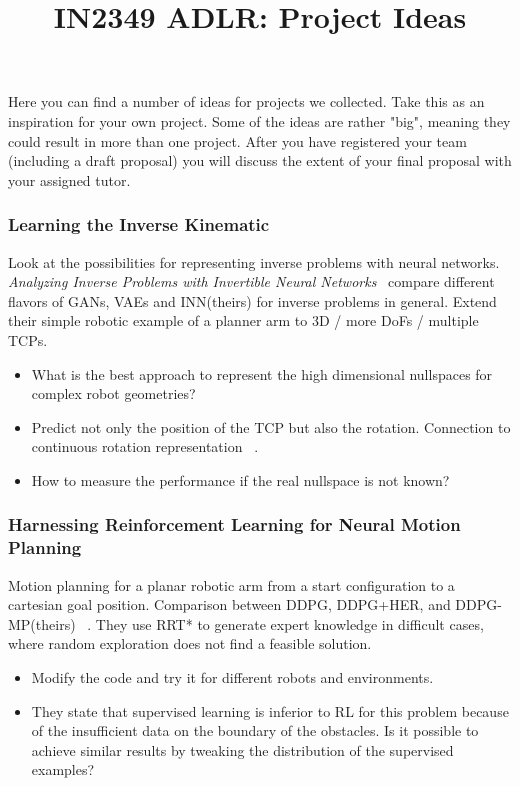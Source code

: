 \documentclass[a4paper]{article}
\title{IN2349 ADLR: Project Ideas}
\begin{document}
\maketitle

Here you can find a number of ideas for projects we collected. Take this as an inspiration for your own project. Some of the ideas are rather "big", meaning they could result in more than one project. After you have registered your team (including a draft proposal) you will discuss the extent of your final proposal with your assigned tutor.


\subsubsection{Learning the Inverse Kinematic}
Look at the possibilities for representing inverse problems with neural networks.
\textit{Analyzing Inverse Problems with Invertible Neural Networks}~\cite{Ardizzone2018}
compare different flavors of GANs, VAEs and INN(theirs) for inverse problems in general. Extend their simple robotic example of a planner arm to 3D / more DoFs / multiple TCPs.
\begin{itemize}
  \item What is the best approach to represent the high dimensional nullspaces for complex robot geometries?
  \item Predict not only the position of the TCP but also the rotation. Connection to continuous rotation representation ~\cite{Zhou2018}.
  \item How to measure the performance if the real nullspace is not known?
\end{itemize}

\subsubsection{Harnessing Reinforcement Learning for Neural Motion Planning}
Motion planning for a planar robotic arm from a start configuration to a cartesian goal position. Comparison between DDPG, DDPG+HER, and DDPG-MP(theirs) ~\cite{Jurgenson2019}.
They use RRT* to generate expert knowledge in difficult cases, where random exploration does not find a feasible solution.
\begin{itemize}
  \item Modify the code and try it for different robots and environments.
  \item They state that supervised learning is inferior to RL for this problem because of the insufficient data on the boundary of the obstacles. Is it possible to achieve similar results by tweaking the distribution of the supervised examples?
\end{itemize}
\end{document}

